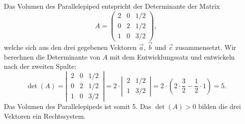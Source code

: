 \begin{hinweis}
\end{hinweis}


\begin{loesung}
Das Volumen des Parallelepiped entspricht der Determinante der Matrix 
\[
 A = \begin{pmatrix} 2 & 0 & 1/2\\ 0 & 2 & 1/2\\ 1 & 0 & 3/2\end{pmatrix},
\]
welche sich aus den drei gegebenen Vektoren $\vec a$, $\vec b$ und $\vec c$ zusammensetzt.
Wir berechnen die Determinante von $A$ mit dem Entwicklungssatz und entwickeln nach der zweiten Spalte:
\[
  \det(A) = \left|\,\begin{matrix} 2 & 0 & 1/2\\ 0 & 2 & 1/2\\ 1 & 0 & 3/2\end{matrix}\,\right| 
  = 2\cdot \left|\,\begin{matrix} 2 & 1/2\\ 1 & 3/2\end{matrix}\,\right| 
  = 2 \cdot(2\cdot \dfrac{3}{2}-\dfrac{1}{2}\cdot 1) 
  = 5.
\]
Das Volumen des Parallelepipeds ist somit 5. Das $\det(A) > 0$ bilden die drei Vektoren ein Rechtssystem.
\end{loesung}




